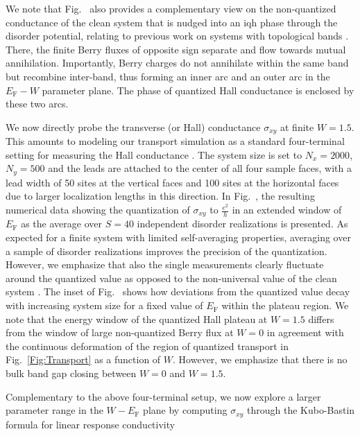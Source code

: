 \documentclass[aps,prl,amsmath,amssymb,twocolumn, superscriptaddress]{revtex4-2}
\begin{document}
We note that Fig.~ also provides a complementary view on the non-quantized conductance of the clean system that is nudged into an \gls{iqh} phase through the disorder potential, relating to previous work on systems with topological bands \cite{Laughlin_IQH_2, Floquet_levitation, Fine_structure}. There, the finite Berry fluxes of opposite sign separate and flow towards mutual annihilation. Importantly, Berry charges do not annihilate within the same band but recombine inter-band, thus forming an inner arc and an outer arc in the $E_\mathrm{F}-W$ parameter plane. The phase of quantized Hall conductance is enclosed by these two arcs.

We now directly probe the transverse (or Hall) conductance $\sigma_{xy}$ at finite $W = 1.5$. This amounts to modeling our transport simulation as a standard four-terminal setting for measuring the Hall conductance \cite{Datta, 4_terminal_Hall}. The system size is set to $N_x = 2000$, $N_y = 500$ and the leads are attached to the center of all four sample faces, with a lead width of 50 sites at the vertical faces and 100 sites at the horizontal faces due to larger localization lengths in this direction. In Fig.~, the resulting numerical data showing the quantization of $\sigma_{xy}$ to $\frac{e^2}{h}$ in an extended window of $E_\mathrm{F}$ as the average over $S = 40$ independent disorder realizations is presented. As expected for a finite system with limited self-averaging properties, averaging over a sample of disorder realizations improves the precision of the quantization. However, we emphasize that also the single measurements clearly fluctuate around the quantized value as opposed to the non-universal value of the clean system \cite{Supplemental}. The inset of Fig.~ shows how deviations from the quantized value decay with increasing system size for a fixed value of $E_\mathrm{F}$ within the plateau region. We note that the energy window of the quantized Hall plateau at $W = 1.5$ differs from the window of large non-quantized Berry flux at $W = 0$ in agreement with the continuous deformation of the region of quantized transport in Fig.~\ref{Fig:Transport} as a function of $W$. However, we emphasize that there is no bulk band gap closing between $W=0$ and $W=1.5$.

Complementary to the above four-terminal setup, we now explore a larger parameter range in the $W-E_\mathrm{F}$ plane by computing $\sigma_{xy}$ through the Kubo-Bastin formula \cite{Kubo_paper, Kubo_Bastin, Kubo_Bastin_modern} for linear response conductivity 
\end{document}
